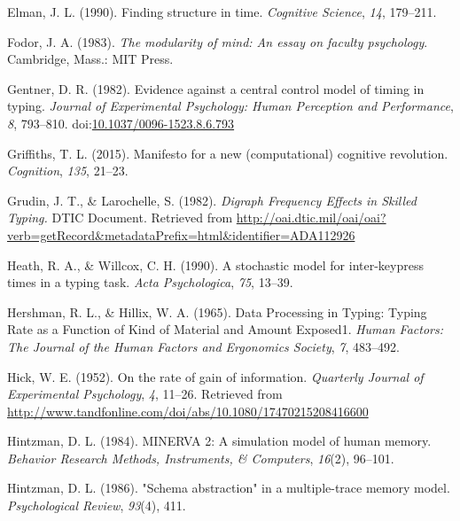 \documentclass[,man,floatsintext]{apa6}
\begin{document}
\leavevmode\hypertarget{ref-elman_finding_1990}{}%
Elman, J. L. (1990). Finding structure in time. \emph{Cognitive Science}, \emph{14}, 179--211.

\leavevmode\hypertarget{ref-fodor_modularity_1983}{}%
Fodor, J. A. (1983). \emph{The modularity of mind: An essay on faculty psychology}. Cambridge, Mass.: MIT Press.

\leavevmode\hypertarget{ref-GentnerEvidencecentralcontrol1982}{}%
Gentner, D. R. (1982). Evidence against a central control model of timing in typing. \emph{Journal of Experimental Psychology: Human Perception and Performance}, \emph{8}, 793--810. doi:\href{https://doi.org/10.1037/0096-1523.8.6.793}{10.1037/0096-1523.8.6.793}

\leavevmode\hypertarget{ref-griffiths_manifesto_2015}{}%
Griffiths, T. L. (2015). Manifesto for a new (computational) cognitive revolution. \emph{Cognition}, \emph{135}, 21--23.

\leavevmode\hypertarget{ref-grudin_digraph_1982}{}%
Grudin, J. T., \& Larochelle, S. (1982). \emph{Digraph Frequency Effects in Skilled Typing.} DTIC Document. Retrieved from \url{http://oai.dtic.mil/oai/oai?verb=getRecord\&metadataPrefix=html\&identifier=ADA112926}

\leavevmode\hypertarget{ref-heath_stochastic_1990}{}%
Heath, R. A., \& Willcox, C. H. (1990). A stochastic model for inter-keypress times in a typing task. \emph{Acta Psychologica}, \emph{75}, 13--39.

\leavevmode\hypertarget{ref-HershmanDataProcessingTyping1965}{}%
Hershman, R. L., \& Hillix, W. A. (1965). Data Processing in Typing: Typing Rate as a Function of Kind of Material and Amount Exposed1. \emph{Human Factors: The Journal of the Human Factors and Ergonomics Society}, \emph{7}, 483--492.

\leavevmode\hypertarget{ref-hick_rate_1952}{}%
Hick, W. E. (1952). On the rate of gain of information. \emph{Quarterly Journal of Experimental Psychology}, \emph{4}, 11--26. Retrieved from \url{http://www.tandfonline.com/doi/abs/10.1080/17470215208416600}

\leavevmode\hypertarget{ref-hintzman1984minerva}{}%
Hintzman, D. L. (1984). MINERVA 2: A simulation model of human memory. \emph{Behavior Research Methods, Instruments, \& Computers}, \emph{16}(2), 96--101.

\leavevmode\hypertarget{ref-hintzman1986schema}{}%
Hintzman, D. L. (1986). "Schema abstraction" in a multiple-trace memory model. \emph{Psychological Review}, \emph{93}(4), 411.
\end{document}
